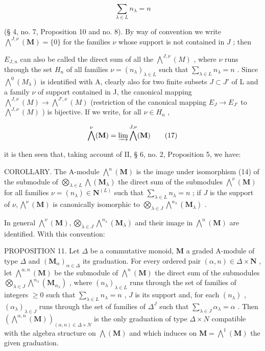 \[
\sum_ {\lambda \in L} n _ {\lambda} = n
\]

(§ 4, no. 7, Proposition 10 and no. 8). By way of convention we write \(\bigwedge^{J,\nu}(\mathbf{M}) = \{0\}\) for the families \(\nu\) whose support is not contained in \(J\) ; then

\(E_{J,n}\) can also be called the direct sum of all the \(\bigwedge^{J,\nu}(M)\) , where \(\nu\) runs through the set \(H_n\) of all families \(\nu = (n_\lambda)_{\lambda \in L}\) such that \(\sum_{\lambda \in L} n_\lambda = n\) . Since \(\bigwedge^0(M_\lambda)\) is identified with A, clearly also for two finite subsets \(J \subset J'\) of L and a family \(\nu\) of support contained in J, the canonical mapping \(\bigwedge^{J,\nu}(M) \to \bigwedge^{J',\nu}(M)\) (restriction of the canonical mapping \(E_J \to E_{J'}\) to \(\bigwedge^{J,\nu}(M)\) ) is bijective. If we write, for all \(\nu \in H_n\) ,

\[
\bigwedge^ {\nu} (\mathbf {M}) = \varinjlim \bigwedge^ {J, \nu} (\mathbf {M})\tag{17}
\]

it is then seen that, taking account of II, § 6, no. 2, Proposition 5, we have:

COROLLARY. The A-module \(\bigwedge^{n}(\mathbf{M})\) is the image under isomorphism (14) of the submodule of \(\bigotimes_{\lambda \in L} \bigwedge (\mathbf{M}_{\lambda})\) the direct sum of the submodules \(\bigwedge^{\nu}(\mathbf{M})\) for all families \(\nu = (n_{\lambda}) \in \mathbf{N}^{(L)}\) such that \(\sum_{\lambda \in L} n_{\lambda} = n\) ; if \(J\) is the support of \(\nu, \bigwedge^{\nu}(\mathbf{M})\) is canonically isomorphic to \(\bigotimes_{\lambda \in J} \bigwedge^{n_{\lambda}}(\mathbf{M}_{\lambda})\) .

In general \(\bigwedge^{\nu}(\mathbf{M}),\bigotimes_{\lambda \in J}\bigwedge^{n_{\lambda}}(\mathbf{M}_{\lambda})\) and their image in \(\bigwedge^n (\mathbf{M})\) are identified. With this convention:

PROPOSITION 11. Let \(\Delta\) be a commutative monoid, \(\mathbf{M}\) a graded A-module of type \(\Delta\) and \((\mathbf{M}_{\alpha})_{\alpha \in \Delta}\) its graduation. For every ordered pair \((\alpha, n) \in \Delta \times \mathbf{N}\) , let \(\bigwedge^{\alpha, n}(\mathbf{M})\) be the submodule of \(\bigwedge^n (\mathbf{M})\) the direct sum of the submodules \(\bigotimes_{\lambda \in J} \bigwedge^{n_{\lambda}}(\mathbf{M}_{\alpha_{\lambda}})\) , where \((n_{\lambda})_{\lambda \in L}\) runs through the set of families of integers \(\geqslant 0\) such that \(\sum_{\lambda \in L} n_{\lambda} = n\) , \(J\) is its support and, for each \((n_{\lambda})\) , \((\alpha_{\lambda})_{\lambda \in J}\) runs through the set of families of \(\Delta^J\) such that \(\sum_{\lambda \in J} \alpha_{\lambda} = \alpha\) . Then \((\bigwedge^{\alpha, n}(\mathbf{M}))_{(\alpha, n) \in \Delta \times N}\) is the only graduation of type \(\Delta \times N\) compatible with the algebra structure on \(\bigwedge(\mathbf{M})\) and which induces on \(\mathbf{M} = \bigwedge^1 (\mathbf{M})\) the given graduation.

